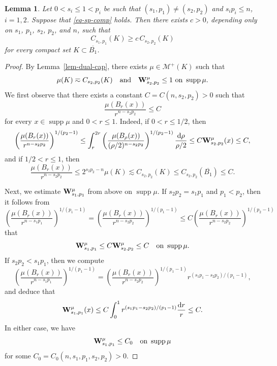 \documentclass[11pt]{amsart}
\theoremstyle{plain}
\newtheorem{lemma}[theorem]{Lemma}
\theoremstyle{definition}
\numberwithin{equation}{section}
\DeclareMathOperator*{\supp}{supp}
\begin{document}
\begin{lemma}\label{lem-cap-sp-comp}
Let $0<s_i\leq 1<p_i$ be such that $(s_1, p_1) \neq (s_2, p_2)$ and $s_ip_i \leq n$, $i=1, 2$. Suppose that \eqref{eq-sp-comp} holds. Then there exists $c>0$, depending only on $s_1$, $p_1$, $s_2$, $p_2$, and $n$, such that
\begin{equation}\label{eq-sp1-sp2}
C_{s_1, p_1}(K) \geq c\,C_{s_2, p_2}(K)
\end{equation}
for every compact set $K \subset \overline{B_1}$.
\end{lemma}

\begin{proof}
By Lemma~\ref{lem-dual-cap}, there exists $\mu \in \mathcal{M}^+(K)$ such that
\begin{equation*}
\mu(K) \eqsim C_{s_2, p_2}(K) \quad\text{and}\quad {\bf W}^{\mu}_{s_2, p_2} \leq 1 \text{ on }\supp{\mu}.
\end{equation*}
We first observe that there exists a constant $C=C(n, s_2, p_2)>0$ such that
\begin{equation*}
\frac{\mu(B_r(x))}{r^{n-s_2p_2}} \leq C
\end{equation*}
for every $x \in \supp{\mu}$ and $0<r\leq 1$. Indeed, if $0<r\leq 1/2$, then
\begin{equation*}
\left( \frac{\mu(B_r(x))}{r^{n-s_2p_2}}\right)^{1/(p_2-1)}  \leq \int_r^{2r} \left( \frac{\mu(B_\rho(x))}{(\rho/2)^{n-s_2p_2}} \right)^{1/(p_2-1)} \frac{\mathrm{d}\rho}{\rho/2} \leq C{\bf W}^\mu_{s_2, p_2}(x) \leq C,
\end{equation*}
and if $1/2<r\leq 1$, then
\begin{equation*}
\frac{\mu(B_r(x))}{r^{n-s_2p_2}} \leq 2^{s_2p_2-n} \mu(K) \lesssim C_{s_2, p_2}(K) \leq C_{s_2, p_2}(\overline{B_1}) \leq C.
\end{equation*}

Next, we estimate ${\bf W}^\mu_{s_1, p_1}$ from above on $\supp{\mu}$. If $s_2p_2=s_1p_1$ and $p_1<p_2$, then it follows from
\begin{equation*}
\left( \frac{\mu(B_r(x))}{r^{n-s_1p_1}} \right)^{1/(p_1-1)} = \left( \frac{\mu(B_r(x))}{r^{n-s_2p_2}} \right)^{1/(p_1-1)} \leq C \left( \frac{\mu(B_r(x))}{r^{n-s_2p_2}} \right)^{1/(p_2-1)}
\end{equation*}
that
\begin{equation*}
{\bf W}^\mu_{s_1, p_1} \leq C {\bf W}^\mu_{s_2, p_2} \leq C \quad\text{on }\supp{\mu}.
\end{equation*}
If $s_2p_2<s_1p_1$, then we compute
\begin{equation*}
\left( \frac{\mu(B_r(x))}{r^{n-s_1p_1}} \right)^{1/(p_1-1)} = \left( \frac{\mu(B_r(x))}{r^{n-s_2p_2}} \right)^{1/(p_1-1)} r^{(s_1p_1 - s_2p_2)/(p_1-1)},
\end{equation*}
and deduce that
\begin{equation*}
{\bf W}^\mu_{s_1, p_1}(x) \leq C \int_0^1 r^{(s_1p_1-s_2p_2)/(p_1-1)} \frac{\mathrm{d}r}{r} \leq C.
\end{equation*}
In either case, we have
\begin{equation*}
{\bf W}^\mu_{s_1, p_1} \leq C_0 \quad\text{on }\supp{\mu}
\end{equation*}
for some $C_0=C_0(n, s_1, p_1, s_2, p_2)>0$.


\end{proof}
\end{document}
